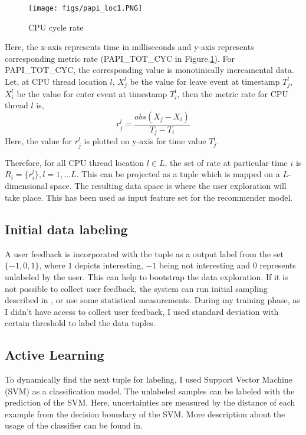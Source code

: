 \begin{figure}[h]
    \centering
    \texttt{[image: figs/papi\_loc1.PNG]}
    \caption{CPU cycle rate}
    \label{fig:papi_tot_cyc1}
\end{figure}
Here, the x-axis represents time in milliseconds and y-axis represents corresponding metric rate ({PAPI\_TOT\_CYC} in Figure.\ref{fig:papi_tot_cyc1}). For
{PAPI\_TOT\_CYC}, the corresponding value is monotinically increamental data. Let, at CPU thread location $l$, $X^l_j$ be the value for leave event at
timestamp $T^l_j$, $X^l_i$ be the value for enter event at timestamp $T^l_i$, then the metric rate for CPU thread $l$ is,
\[
    r^l_j = \dfrac{abs(X_j-X_i)}{T_j-T_i}
\]
Here, the value for $r^l_j$ is plotted on y-axis for time value $T^l_j$.
\par
Therefore, for all CPU thread location $l \in L$, the set of rate at particular time $i$ is $R_i = \{r^l_i\}, l = 1, \dots L$. This can be projected as a
tuple which is mapped on a $L$-dimensional space. The resulting data space is where the user exploration will take place. This has been used as input feature
set for the recommender model.
%
%
\subsection{Initial data labeling} A user feedback is incorporated with the tuple as a output label from the set $\{-1, 0,1\}$, where $1$ depicts interesting,
$-1$ being not interesting and $0$ represents unlabeled by the user. This can help to bootstrap the data exploration. If it is not possible to collect user
feedback, the system can run initial sampling described in \cite{liu2018analysis}\cite{dimitriadou2014explore}, or use some statistical measurements. During
my training phase, as I didn't have access to collect user feedback, I used standard deviation with certain threshold to label the data tuples.
%
%
\subsection{Active Learning}
To dynamically find the next tuple for labeling, I used Support Vector Machine (SVM)\cite{suykens1999least} as a classification model. The unlabeled samples
can be labeled with the prediction of the {SVM}. Here, uncertainties are measured by the distance of each example from the decision boundary of the SVM. More
description about the usage of the classifier can be found in\cite{huang2019aideme}.
%
%
